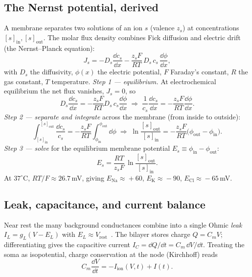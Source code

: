 \documentclass[11pt]{article}
\begin{document}
\subsection{The Nernst potential, derived}
A membrane separates two solutions of an ion $s$ (valence $z_s$) at concentrations
$[s]_{\mathrm{in}},[s]_{\mathrm{out}}$. The molar flux density combines Fick diffusion and electric
drift (the Nernst--Planck equation):
\begin{equation}
  J_s=-D_s\frac{\dd c_s}{\dd x}-\frac{z_sF}{RT}\,D_s\,c_s\,\frac{\dd\phi}{\dd x},
\end{equation}
with $D_s$ the diffusivity, $\phi(x)$ the electric potential, $F$ Faraday's constant, $R$ the gas
constant, $T$ temperature. \emph{Step 1 --- equilibrium.} At electrochemical equilibrium the net
flux vanishes, $J_s=0$, so
\begin{equation}
  D_s\frac{\dd c_s}{\dd x}=-\frac{z_sF}{RT}D_s\,c_s\frac{\dd\phi}{\dd x}
  \;\Longrightarrow\;
  \frac{1}{c_s}\frac{\dd c_s}{\dd x}=-\frac{z_sF}{RT}\frac{\dd\phi}{\dd x}.
\end{equation}
\emph{Step 2 --- separate and integrate} across the membrane (from inside to outside):
\begin{equation}
  \int_{[s]_{\mathrm{in}}}^{[s]_{\mathrm{out}}}\frac{\dd c_s}{c_s}
  =-\frac{z_sF}{RT}\int_{\phi_{\mathrm{in}}}^{\phi_{\mathrm{out}}}\dd\phi
  \;\Longrightarrow\;
  \ln\frac{[s]_{\mathrm{out}}}{[s]_{\mathrm{in}}}=-\frac{z_sF}{RT}\big(\phi_{\mathrm{out}}-\phi_{\mathrm{in}}\big).
\end{equation}
\emph{Step 3 --- solve} for the equilibrium membrane potential $E_s\equiv\phi_{\mathrm{in}}-
\phi_{\mathrm{out}}$:
\begin{equation}
  \boxed{\;E_s=\frac{RT}{z_sF}\,\ln\frac{[s]_{\mathrm{out}}}{[s]_{\mathrm{in}}}.\;}
  \label{eq:nernst}
\end{equation}
At $37^\circ$C, $RT/F\approx26.7$\,mV, giving $E_{\mathrm{Na}}\!\approx\!+60$,
$E_{\mathrm{K}}\!\approx\!-90$, $E_{\mathrm{Cl}}\!\approx\!-65$\,mV.

\subsection{Leak, capacitance, and current balance}
Near rest the many background conductances combine into a single Ohmic \emph{leak}
$I_L=g_L(V-E_L)$ with $E_L\approx V_{\mathrm{rest}}$~\cite{gerstner2014,dayan2001}. The bilayer stores
charge $Q=C_mV$; differentiating gives the capacitive current $I_C=\dd Q/\dd t=C_m\,\dd V/\dd t$.
Treating the soma as isopotential, charge conservation at the node (Kirchhoff) reads
\begin{equation}
  C_m\frac{\dd V}{\dd t}=-I_{\mathrm{ion}}(V,t)+I(t).
  \label{eq:kcl}
\end{equation}
\end{document}
